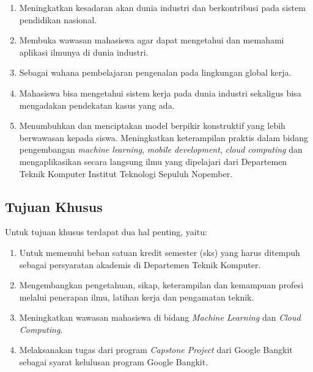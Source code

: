     \begin{enumerate}[nolistsep]

      \item Meningkatkan kesadaran akan dunia industri dan berkontribusi pada sistem pendidikan nasional.

      \item Membuka wawasan mahasiswa agar dapat mengetahui dan memahami aplikasi ilmunya di dunia industri.

      \item Sebagai wahana pembelajaran pengenalan pada lingkungan global kerja.

      \item Mahasiswa bisa mengetahui sistem kerja pada dunia industri sekaligus bisa mengadakan pendekatan kasus yang ada.

      \item Menumbuhkan dan menciptakan model berpikir konstruktif yang lebih berwawasan kepada siswa. Meningkatkan keterampilan praktis dalam bidang pengembangan \textit{machine learning}, \textit{mobile development}, \textit{cloud computing} dan mengaplikasikan secara langsung ilmu yang dipelajari dari Departemen Teknik Komputer Institut Teknologi Sepuluh Nopember.

    \end{enumerate}

  \subsection{Tujuan Khusus}
  Untuk tujuan khusus terdapat dua hal penting, yaitu:

    \begin{enumerate}[nolistsep]
      
      \item Untuk memenuhi beban satuan kredit semester (sks) yang harus ditempuh sebagai persyaratan akademis di Departemen Teknik Komputer.

      \item Mengembangkan pengetahuan, sikap, keterampilan dan kemampuan profesi melalui penerapan ilmu, latihan kerja dan pengamatan teknik.

      \item Meningkatkan wawasan mahasiswa di bidang \textit{Machine Learning} dan \textit{Cloud Computing}.

      \item Melaksanakan tugas dari program \textit{Capstone Project} dari Google Bangkit sebagai syarat kelulusan program Google Bangkit.

    \end{enumerate}

